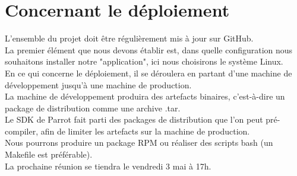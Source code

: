\documentclass[]{article}
\begin{document}
\section{Concernant le déploiement}
L'ensemble du projet doit être régulièrement mis à jour sur GitHub.\\
La premier élément que nous devons établir est, dans quelle configuration nous souhaitons installer notre "application", ici nous choisirons le système Linux.\\
En ce qui concerne le déploiement, il se déroulera en partant d'une machine de développement jusqu'à une machine de production.\\
La machine de développement produira des artefacts binaires, c'est-à-dire un package de distribution comme une archive .tar.\\
Le SDK de Parrot fait parti des packages de distribution que l'on peut pré-compiler, afin de limiter les artefacts sur la machine de production.\\
Nous pourrons produire un package RPM ou réaliser des scripts bash (un Makefile est préférable).\\

La prochaine réunion se tiendra le vendredi 3 mai à 17h.
\end{document}
